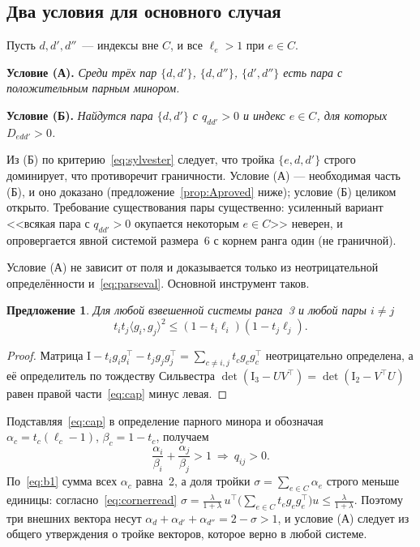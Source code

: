 \documentclass[11pt,a4paper]{article}
\theoremstyle{plain}
\newtheorem{proposition}[theorem]{Предложение}
\theoremstyle{definition}
\theoremstyle{remark}
\newcommand{\Id}{\mathrm{I}}
\newcommand{\T}{^{\!\top}}
\begin{document}
\subsection{Два условия для основного случая}\label{sub:AB}

Пусть $d,d',d''$~--- индексы вне $C$, и все $\ell_e>1$ при $e\in C$.

\smallskip\noindent
\textbf{Условие (А).} \emph{Среди трёх пар $\{d,d'\}$, $\{d,d''\}$,
$\{d',d''\}$ есть пара с положительным парным минором.}

\smallskip\noindent
\textbf{Условие (Б).} \emph{Найдутся пара $\{d,d'\}$ с $q_{dd'}>0$ и индекс
$e\in C$, для которых $D_{edd'}>0$.}

\smallskip
Из (Б) по критерию~\eqref{eq:sylvester} следует, что тройка $\{e,d,d'\}$
строго доминирует, что противоречит граничности. Условие (А) --- необходимая
часть (Б), и оно доказано (предложение~\ref{prop:Aproved} ниже); условие (Б)
целиком открыто. Требование существования пары существенно: усиленный вариант
<<всякая пара с $q_{dd'}>0$ окупается некоторым $e\in C$>> неверен, и
опровергается явной системой размера~6 с корнем ранга один (не граничной).

Условие (А) не зависит от поля и доказывается только из неотрицательной
определённости и~\eqref{eq:parseval}. Основной инструмент таков.

\begin{proposition}\label{prop:cap}
Для любой взвешенной системы ранга~3 и любой пары $i\ne j$
\begin{equation}\label{eq:cap}
  t_it_j\langle g_i,g_j\rangle^2\le(1-t_i\ell_i)(1-t_j\ell_j).
\end{equation}
\end{proposition}
\begin{proof}
Матрица $\Id-t_ig_ig_i\T-t_jg_jg_j\T=\sum_{c\ne i,j}t_cg_cg_c\T$ неотрицательно
определена, а её определитель по тождеству Сильвестра
$\det(\Id_3-UV\T)=\det(\Id_2-V\T U)$ равен правой части~\eqref{eq:cap} минус
левая.
\end{proof}

Подставляя~\eqref{eq:cap} в определение парного минора и обозначая
$\alpha_c=t_c(\ell_c-1)$, $\beta_c=1-t_c$, получаем
\begin{equation}\label{eq:crit}
  \frac{\alpha_i}{\beta_i}+\frac{\alpha_j}{\beta_j}>1
  \ \Longrightarrow\ q_{ij}>0 .
\end{equation}
По~\eqref{eq:b1} сумма всех $\alpha_c$ равна~2, а доля тройки
$\sigma=\sum_{e\in C}\alpha_e$ строго меньше единицы: согласно~\eqref{eq:cornerread}
$\sigma=\frac{\lambda}{1+\lambda}\,u\T\bigl(\sum_{e\in C}t_eg_eg_e\T\bigr)u
\le\frac{\lambda}{1+\lambda}$. Поэтому три внешних вектора несут
$\alpha_d+\alpha_{d'}+\alpha_{d''}=2-\sigma>1$, и условие (А) следует из
общего утверждения о тройке векторов, которое верно в любой системе.
\end{document}
